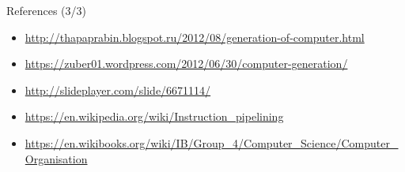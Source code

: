 \documentclass{beamer}
\begin{document}
\begin{frame}
{\centerline{References (3/3)}}
\begin{itemize}
\item \url{http://thapaprabin.blogspot.ru/2012/08/generation-of-computer.html} \\
\item \url{https://zuber01.wordpress.com/2012/06/30/computer-generation/} \\
\item \url{http://slideplayer.com/slide/6671114/} \\
\item \url{https://en.wikipedia.org/wiki/Instruction\_pipelining} \\
\item \url{https://en.wikibooks.org/wiki/IB/Group\_4/Computer\_Science/Computer\_Organisation} \\
\end{itemize}
\end{frame}
\end{document}
